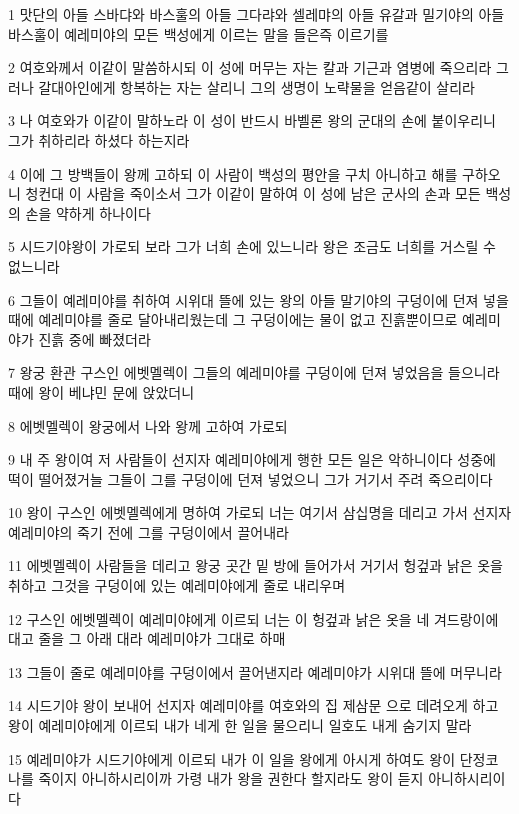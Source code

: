 \par 1 맛단의 아들 스바댜와 바스훌의 아들 그다랴와 셀레먀의 아들 유갈과 밀기야의 아들 바스훌이 예레미야의 모든 백성에게 이르는 말을 들은즉 이르기를
\par 2 여호와께서 이같이 말씀하시되 이 성에 머무는 자는 칼과 기근과 염병에 죽으리라 그러나 갈대아인에게 항복하는 자는 살리니 그의 생명이 노략물을 얻음같이 살리라
\par 3 나 여호와가 이같이 말하노라 이 성이 반드시 바벨론 왕의 군대의 손에 붙이우리니 그가 취하리라 하셨다 하는지라
\par 4 이에 그 방백들이 왕께 고하되 이 사람이 백성의 평안을 구치 아니하고 해를 구하오니 청컨대 이 사람을 죽이소서 그가 이같이 말하여 이 성에 남은 군사의 손과 모든 백성의 손을 약하게 하나이다
\par 5 시드기야왕이 가로되 보라 그가 너희 손에 있느니라 왕은 조금도 너희를 거스릴 수 없느니라
\par 6 그들이 예레미야를 취하여 시위대 뜰에 있는 왕의 아들 말기야의 구덩이에 던져 넣을 때에 예레미야를 줄로 달아내리웠는데 그 구덩이에는 물이 없고 진흙뿐이므로 예레미야가 진흙 중에 빠졌더라
\par 7 왕궁 환관 구스인 에벳멜렉이 그들의 예레미야를 구덩이에 던져 넣었음을 들으니라 때에 왕이 베냐민 문에 앉았더니
\par 8 에벳멜렉이 왕궁에서 나와 왕께 고하여 가로되
\par 9 내 주 왕이여 저 사람들이 선지자 예레미야에게 행한 모든 일은 악하니이다 성중에 떡이 떨어졌거늘 그들이 그를 구덩이에 던져 넣었으니 그가 거기서 주려 죽으리이다
\par 10 왕이 구스인 에벳멜렉에게 명하여 가로되 너는 여기서 삼십명을 데리고 가서 선지자 예레미야의 죽기 전에 그를 구덩이에서 끌어내라
\par 11 에벳멜렉이 사람들을 데리고 왕궁 곳간 밑 방에 들어가서 거기서 헝겊과 낡은 옷을 취하고 그것을 구덩이에 있는 예레미야에게 줄로 내리우며
\par 12 구스인 에벳멜렉이 예레미야에게 이르되 너는 이 헝겊과 낡은 옷을 네 겨드랑이에 대고 줄을 그 아래 대라 예레미야가 그대로 하매
\par 13 그들이 줄로 예레미야를 구덩이에서 끌어낸지라 예레미야가 시위대 뜰에 머무니라
\par 14 시드기야 왕이 보내어 선지자 예레미야를 여호와의 집 제삼문 으로 데려오게 하고 왕이 예레미야에게 이르되 내가 네게 한 일을 물으리니 일호도 내게 숨기지 말라
\par 15 예레미야가 시드기야에게 이르되 내가 이 일을 왕에게 아시게 하여도 왕이 단정코 나를 죽이지 아니하시리이까 가령 내가 왕을 권한다 할지라도 왕이 듣지 아니하시리이다
